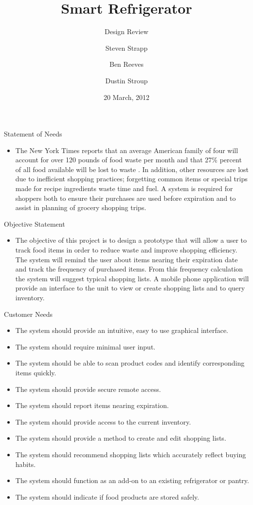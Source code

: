 \documentclass[t]{beamer}
\title[Smart Refrigerator: Design Review] %
{Smart Refrigerator}
\subtitle
{Design Review} %
\author[Steven Strapp, Ben Reeves, Dustin Stroup] %
{Steven Strapp \and Ben Reeves \and Dustin Stroup}
\date[20 March, 2012] %
{20 March, 2012}
\begin{document}
\begin{frame}
  \titlepage
\end{frame}

\begin{frame}{Statement of Needs}
\Large
\begin{itemize}
\item The New York Times reports that an average American family of four will account for over 120 pounds of food waste per month and that 27\% percent of all food available will be lost to waste \cite{times}. In addition, other resources are lost due to inefficient shopping practices; forgetting common items or special trips made for recipe ingredients waste time and fuel. A system is required for shoppers both to ensure their purchases are used before expiration and to assist in planning of grocery shopping trips.
\end{itemize}
\end{frame}

\begin{frame}{Objective Statement}
\Large
\begin{itemize}
\item The objective of this project is to design a prototype that will allow a user to track food items in order to reduce waste and improve shopping efficiency. The system will remind the user about items nearing their expiration date and track the frequency of purchased items. From this frequency calculation the system will suggest typical shopping lists. A mobile phone application will provide an interface to the unit to view or create shopping lists and to query inventory.
\end{itemize}
\end{frame}

\begin{frame}{Customer Needs}
\footnotesize
\begin{itemize}
\item The system should provide an intuitive, easy to use graphical interface.
\item The system should require minimal user input.
\item The system should be able to scan product codes and identify corresponding items quickly.
\item The system should provide secure remote access.
\item The system should report items nearing expiration.
\item The system should provide access to the current inventory.
\item The system should provide a method to create and edit shopping lists.
\item The system should recommend shopping lists which accurately reflect buying habits.
\item The system should function as an add-on to an existing refrigerator or pantry.
\item The system should indicate if food products are stored safely.
\end{itemize}
\end{frame}
\end{document}
